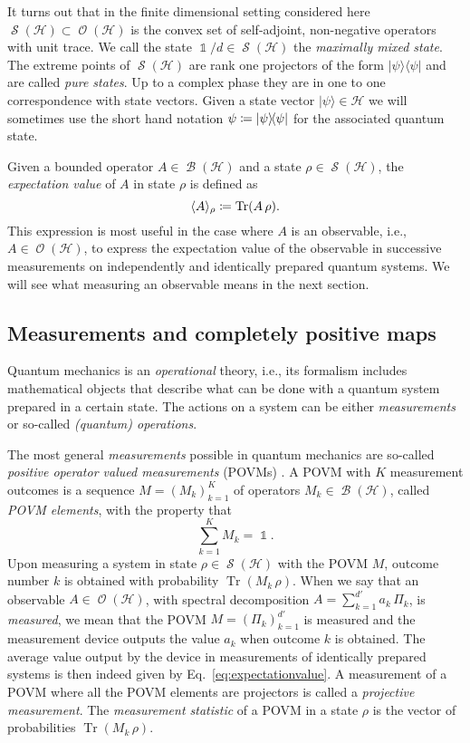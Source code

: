 \documentclass[a4paper,12pt,listof=totoc,index=totoc,bibliography=totoc,headsepline=false,headings=normal,BCOR16.153846mm,DIV12,headinclude,twoside,cleardoublepage=empty,numbers=noenddot,final]{scrreprt}
\theoremstyle{mystyle}
\numberwithin{equation}{section}
\numberwithin{figure}{section}
\numberwithin{lemma}{section}
\numberwithin{theorem}{section}
\numberwithin{corollary}{section}
\numberwithin{definition}{section}
\numberwithin{conjecture}{section}
\numberwithin{observation}{section}
\newcommand{\+}{\mkern2mu}
\newcommand{\coloneqq}{\mathrel{\vcentcolon\mkern-1.2mu=}} %
\newcommand{\texteqref}[1]{Eq.~\eqref{#1}}
\newcommand{\bra}[1]{\langle #1|}
\newcommand{\ket}[1]{|#1\rangle}
\newcommand{\ketbra}[2]{\ket{#1}\!\bra{#2}}
\newcommand{\ex}[2]{\langle #1 \rangle_{#2}}
\DeclareMathOperator{\1}{\mathds{1}}
\DeclareMathOperator{\Bop}{\mathcal{B}}
\DeclareMathOperator{\Obs}{\mathcal{O}}
\DeclareMathOperator{\Qst}{\mathcal{S}}
\DeclareMathOperator{\Tr}{Tr}
\newcommand{\mc}[1]{\mathcal{#1}}
\newcommand{\mcH}{\mc{H}}
\begin{document}
It turns out that in the finite dimensional setting considered here $\Qst(\mcH) \subset \Obs(\mcH)$ is the convex set of self-adjoint, non-negative operators with unit trace.
We call the state $\1 / d \in \Qst(\mcH)$ the \emph{maximally mixed state}.
The extreme points of $\Qst(\mcH)$ are rank one projectors of the form $\ketbra\psi\psi$ and are called \emph{pure states}.
Up to a complex phase they are in one to one correspondence with state vectors.
Given a state vector $\ket\psi\in\mcH$ we will sometimes use the short hand notation $\psi \coloneqq \ketbra\psi\psi$ for the associated quantum state.

Given a bounded operator $A \in \Bop(\mcH)$ and a state $\rho \in \Qst(\mcH)$, the \emph{expectation value} of $A$ in state $\rho$ is defined as
\begin{equation} \label{eq:expectationvalue}
 \ex A \rho \coloneqq \Tr(A\,\rho). 
\end{equation}
This expression is most useful in the case where $A$ is an observable, i.e., $A \in \Obs(\mcH)$, to express the expectation value of the observable in successive measurements on independently and identically prepared quantum systems.
We will see what measuring an observable means in the next section.


\subsection{Measurements and completely positive maps}
\label{sec:measurementsandcompletelypositivmaps}
%
Quantum mechanics is an \emph{operational} theory, i.e., its formalism includes mathematical objects that describe what can be done with a quantum system prepared in a certain state.
The actions on a system can be either \emph{measurements} or so-called \emph{(quantum) operations}.

The most general \emph{measurements} possible in quantum mechanics are so-called \emph{positive operator valued measurements} (POVMs) \cite{nielsenchuang}.
A POVM with $K$ measurement outcomes is a sequence $M = (M_k)_{k=1}^K$ of operators $M_k \in \Bop(\mcH)$, called \emph{POVM elements}, with the property that
\begin{equation}
  \sum_{k=1}^K M_k = \1 .
\end{equation}
Upon measuring a system in state $\rho \in \Qst(\mcH)$ with the POVM $M$, outcome number $k$ is obtained with probability $\Tr(M_k\,\rho)$.
When we say that an observable $A \in \Obs(\mcH)$, with spectral decomposition $A = \sum_{k=1}^{d'} a_k\,\Pi_k$, is \emph{measured}, we mean that the POVM $M = (\Pi_k)_{k=1}^{d'}$ is measured and the measurement device outputs the value $a_k$ when outcome $k$ is obtained.
The average value output by the device in measurements of identically prepared systems is then indeed given by \texteqref{eq:expectationvalue}.
A measurement of a POVM where all the POVM elements are projectors is called a \emph{projective measurement}.
The \emph{measurement statistic} of a POVM in a state $\rho$ is the vector of probabilities $\Tr(M_k\,\rho)$.
\end{document}
